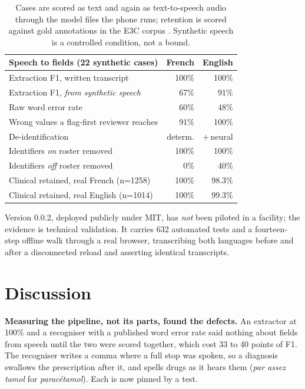\begin{table}[t]
\centering\footnotesize
\begin{tabular}{lrr}
\toprule
Speech to fields (22 synthetic cases) & French & English \\
\midrule
Extraction F1, written transcript & 100\% & 100\% \\
Extraction F1, \emph{from synthetic speech} & 67\% & 91\% \\
Raw word error rate & 60\% & 48\% \\
Wrong values a flag-first reviewer reaches & 91\% & 100\% \\
\midrule
De-identification & determ. & +\,neural \\
\midrule
Identifiers \emph{on} roster removed & 100\% & 100\% \\
Identifiers \emph{off} roster removed & 0\% & 40\% \\
Clinical retained, real French (n=1258) & 100\% & 98.3\% \\
Clinical retained, real English (n=1014) & 100\% & 99.3\% \\
\bottomrule
\end{tabular}
\caption{Cases are scored as text and again as text-to-speech audio through the
model files the phone runs; retention is scored against gold annotations in the
E3C corpus \citep{magnini2021e3c}. Synthetic speech is a controlled condition,
not a bound.}
\end{table}

Version 0.0.2, deployed publicly under MIT, has \emph{not} been piloted in a
facility; the evidence is technical validation. It carries 632 automated tests
and a fourteen-step offline walk through a real browser, transcribing both
languages before and after a disconnected reload and asserting identical
transcripts.

\section{Discussion}

\textbf{Measuring the pipeline, not its parts, found the defects.} An extractor
at 100\% and a recogniser with a published word error rate said nothing about
fields from speech until the two were scored together, which cost 33 to 40
points of F1. The recogniser writes a comma where a full stop was spoken, so a
diagnosis swallows the prescription after it, and spells drugs as it hears them
(\emph{par assez tamol} for \emph{parac\'etamol}). Each is now pinned by a test.

